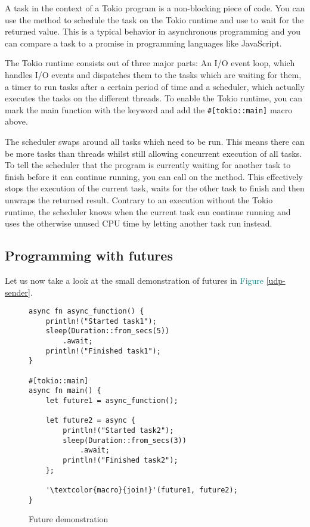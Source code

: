 A task in the context of a Tokio program is a non-blocking piece of code. You can use the 
method to schedule the task on the Tokio runtime and use  to wait for the returned value. This is a typical
behavior in asynchronous programming and you can compare a task to a promise in programming languages like JavaScript.

The Tokio runtime consists out of three major parts: An I/O event loop, which handles I/O events and dispatches them to
the tasks which are waiting for them, a timer to run tasks after a certain period of time and  a scheduler, which
actually executes the tasks on the different threads. To enable the Tokio runtime, you can mark the main function with
the  keyword and add the \texttt{#[tokio::main]} macro above.

The scheduler swaps around all tasks which need to be run. This means there can be more tasks than threads whilst still
allowing concurrent execution of all tasks. To tell the scheduler that the program is currently waiting for another
task to finish before it can continue running, you can call  on the method. This effectively stops the
execution of the current task, waits for the other task to finish and then unwraps the returned result. Contrary to an
execution without the Tokio runtime, the scheduler knows when the current task can continue running and uses the
otherwise unused CPU time by letting another task run instead.

\subsection{Programming with futures}
Let us now take a look at the small demonstration of futures in \textcolor{teal}{Figure \ref{udp-sender}}.

\begin{figure}[ht]
    \begin{verbatim}
async fn async_function() {
    println!("Started task1");
    sleep(Duration::from_secs(5))
        .await;
    println!("Finished task1");
}

#[tokio::main]
async fn main() {
    let future1 = async_function();

    let future2 = async {
        println!("Started task2");
        sleep(Duration::from_secs(3))
            .await;
        println!("Finished task2");
    };

    '\textcolor{macro}{join!}'(future1, future2);
}
    \end{verbatim}
    \caption{Future demonstration}
    \label{future}
\end{figure}

